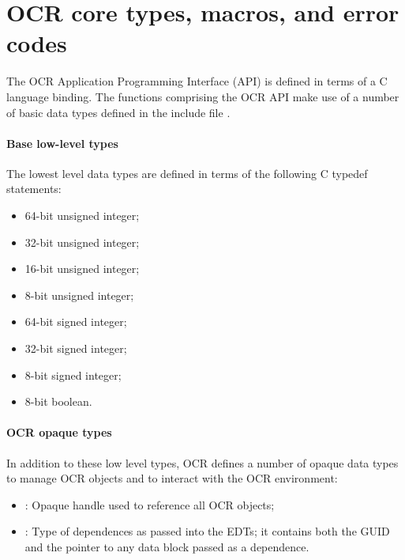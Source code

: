 %

\section{OCR core types, macros, and error codes}
\label{sec:OCRtypesmacros}

The OCR Application Programming Interface (API) is defined in terms of a
C language binding. The functions comprising the OCR API make use of a number of
basic data types defined in the include file .
\paragraph*{Base low-level types}
The lowest level data types are defined in terms of the following C typedef
statements:
\begin{itemize}
\item \hypertarget{type_u64}{} 64-bit unsigned integer;
\item \hypertarget{type_u32}{} 32-bit unsigned integer;
\item \hypertarget{type_u16}{} 16-bit unsigned integer;
\item \hypertarget{type_u8}{} 8-bit unsigned integer;
\item \hypertarget{type_s64}{} 64-bit signed integer;
\item \hypertarget{type_s32}{} 32-bit signed integer;
\item \hypertarget{type_s8}{} 8-bit signed integer;
\item \hypertarget{type_bool}{} 8-bit boolean.
\end{itemize}
\paragraph*{OCR opaque types}
In addition to these low level types, OCR defines a number of opaque data types
to manage OCR objects and to interact with the OCR environment:
\begin{itemize}
\item \hypertarget{type_ocrGuid_t}{}: Opaque handle used to
reference all OCR objects;
\item \hypertarget{type_ocrEdtDep_t}{}: Type of dependences as
passed into the EDTs; it contains both the GUID and the pointer to any data block
passed as a dependence.
\end{itemize}
